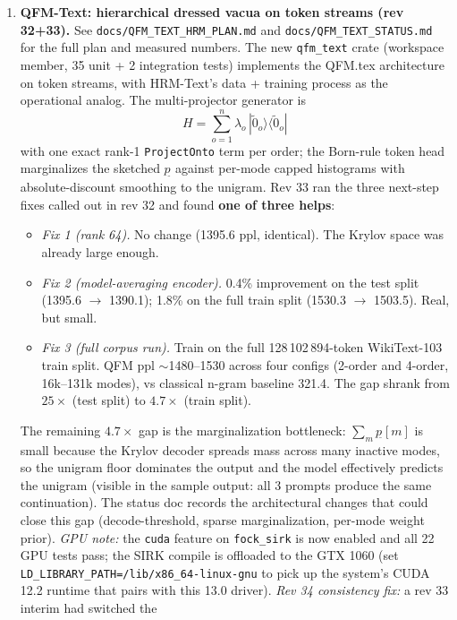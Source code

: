 \documentclass[11pt, a4paper]{article}
\begin{document}
\begin{enumerate}
\item \textbf{QFM-Text: hierarchical dressed vacua on token streams
  (rev 32+33).} See \texttt{docs/QFM\_TEXT\_HRM\_PLAN.md} and
  \texttt{docs/QFM\_TEXT\_STATUS.md} for the full plan and
  measured numbers. The new \texttt{qfm\_text} crate
  (workspace member, 35 unit + 2 integration tests) implements
  the QFM.tex architecture on token streams, with HRM-Text's
  data + training process as the operational analog. The
  multi-projector generator is
  $$H = \sum_{o=1}^{n} \lambda_o \, |\tilde 0_o\rangle\langle \tilde 0_o|$$
  with one exact rank-1 \texttt{ProjectOnto} term per order; the
  Born-rule token head marginalizes the sketched $p_{\tilde{}}$ against
  per-mode capped histograms with absolute-discount smoothing to the
  unigram. Rev 33 ran the three next-step fixes called out in rev 32
  and found \textbf{one of three helps}:
  \begin{itemize}
  \item \emph{Fix 1 (rank 64).} No change (1395.6 ppl, identical).
        The Krylov space was already large enough.
  \item \emph{Fix 2 (model-averaging encoder).} 0.4\% improvement
        on the test split (1395.6 $\to$ 1390.1); 1.8\% on the
        full train split (1530.3 $\to$ 1503.5). Real, but small.
  \item \emph{Fix 3 (full corpus run).} Train on the full
        128\,102\,894-token WikiText-103 train split. QFM ppl
        $\sim$1480--1530 across four configs (2-order and 4-order,
        16k--131k modes), vs classical n-gram baseline 321.4. The
        gap shrank from $25\times$ (test split) to $4.7\times$
        (train split).
  \end{itemize}
  The remaining $4.7\times$ gap is the marginalization bottleneck:
  $\sum_m p_{\tilde{}}[m]$ is small because the Krylov decoder
  spreads mass across many inactive modes, so the unigram floor
  dominates the output and the model effectively predicts the
  unigram (visible in the sample output: all 3 prompts produce
  the same continuation). The status doc records the architectural
  changes that could close this gap (decode-threshold, sparse
  marginalization, per-mode weight prior).
  \emph{GPU note:} the \texttt{cuda} feature on \texttt{fock\_sirk}
  is now enabled and all 22 GPU tests pass; the SIRK compile is
  offloaded to the GTX 1060 (set
  \texttt{LD\_LIBRARY\_PATH=/lib/x86\_64-linux-gnu} to pick up the
  system's CUDA 12.2 runtime that pairs with this 13.0 driver).
  \emph{Rev 34 consistency fix:} a rev 33 interim had switched the

\end{enumerate}
\end{document}
